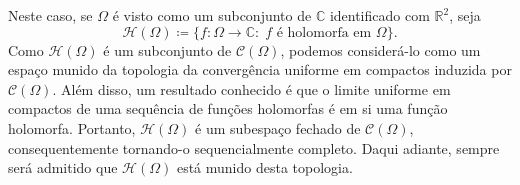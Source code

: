 \documentclass[../distribution_theory_notes.tex]{subfiles}
\begin{document}
 \begin{example}
  Neste caso, se \(\Omega \) é visto como um subconjunto de \(\mathbb{C}\) identificado com \(\mathbb{R}^{2}\), seja 
    \[
      \mathcal{H}(\Omega )\coloneqq \{f:\Omega \rightarrow \mathbb{C}:\; f \text{ é holomorfa em }\Omega \}.
    \]
    Como \(\mathcal{H}(\Omega )\) é um subconjunto de \(\mathcal{C}(\Omega )\), podemos considerá-lo como um espaço munido da topologia da convergência uniforme em compactos induzida por \(\mathcal{C}(\Omega )\). Além disso, um resultado conhecido é que o limite uniforme em compactos de uma sequência de funções holomorfas é em si uma função holomorfa. Portanto, \(\mathcal{H}(\Omega )\) é um subespaço fechado de \(\mathcal{C}(\Omega )\), consequentemente tornando-o sequencialmente completo. Daqui adiante, sempre será admitido que \(\mathcal{H}(\Omega )\) está munido desta topologia.
\end{example}
\end{document}
